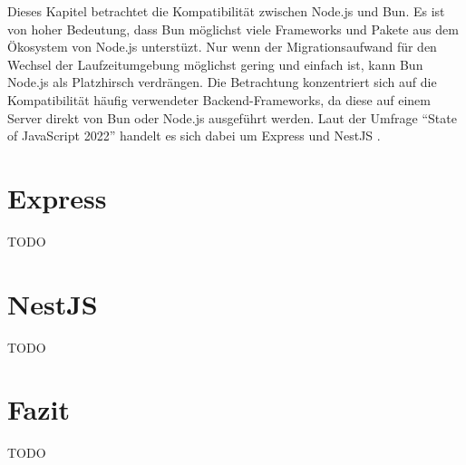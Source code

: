   \label{compabitility}
Dieses Kapitel betrachtet die Kompatibilität zwischen Node.js und Bun. Es ist von hoher Bedeutung, dass Bun möglichst viele Frameworks und Pakete aus dem Ökosystem von Node.js unterstüzt. Nur wenn der Migrationsaufwand für den Wechsel der Laufzeitumgebung möglichst gering und einfach ist, kann Bun Node.js als Platzhirsch verdrängen. Die Betrachtung konzentriert sich auf die Kompatibilität häufig verwendeter Backend-Frameworks, da diese auf einem Server direkt von Bun oder Node.js ausgeführt werden. Laut der Umfrage ``State of JavaScript 2022'' handelt es sich dabei um Express und NestJS \cite{Greif.2022}.

\section{Express} \label{sec:compabitility-newProjects}
TODO\\

\section{NestJS} \label{sec:compabitility-existingProjects}
TODO\\

\section{Fazit} \label{sec:compabitility-conclusion}
TODO\\